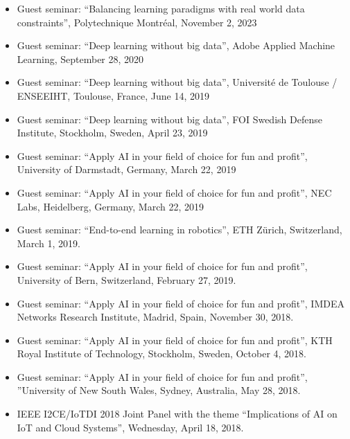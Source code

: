 \begin{itemize}

\item Guest seminar: ``Balancing learning paradigms with real world data constraints'', Polytechnique Montréal, November 2, 2023

\item Guest seminar: ``Deep learning without big data'',
  Adobe Applied Machine Learning, September 28, 2020

\item Guest seminar: ``Deep learning without big data'',
  Universit{\'e} de Toulouse / ENSEEIHT, Toulouse, France, June 14, 2019

\item Guest seminar: ``Deep learning without big data'',
FOI Swedish Defense Institute, Stockholm, Sweden, April 23, 2019

\item Guest seminar: ``Apply AI in your field of choice for fun and profit'',
            University of Darmstadt, Germany, March 22, 2019

\item Guest seminar: ``Apply AI in your field of choice for fun and profit'',
        NEC Labs, Heidelberg, Germany, March 22, 2019

\item Guest seminar: ``End-to-end learning in robotics'',
        ETH Z{\"u}rich, Switzerland, March 1, 2019.

\item Guest seminar: ``Apply AI in your field of choice for fun and profit'',
        University of Bern, Switzerland, February 27, 2019.

\item Guest seminar: ``Apply AI in your field of choice for fun and profit'',
    IMDEA Networks  Research Institute, Madrid, Spain, November 30, 2018.

\item Guest seminar: ``Apply AI in your field of choice for fun and profit'',
KTH Royal Institute of Technology, Stockholm, Sweden, October 4, 2018.

\item Guest seminar: ``Apply AI in your field of choice for fun and profit'',
''University of New South Wales, Sydney, Australia, May 28, 2018.

\item IEEE I2CE/IoTDI 2018 Joint Panel with the theme
    ``Implications of AI on IoT and Cloud Systems'', Wednesday, April 18, 2018.


\end{itemize}
